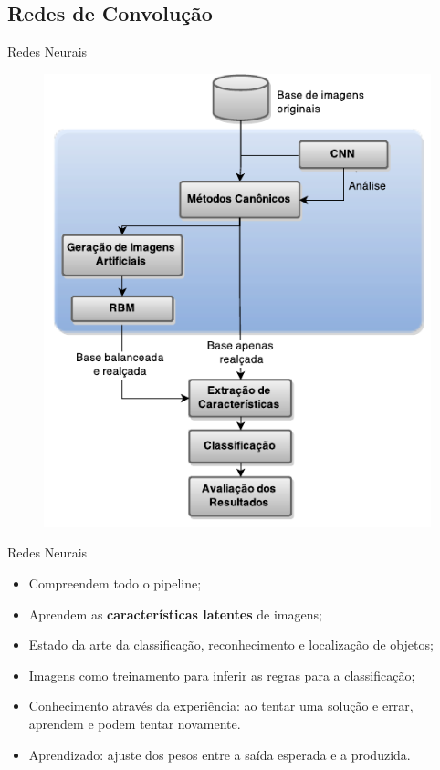 \documentclass{beamer}
\begin{document}
\subsection{Redes de Convolução}
\begin{frame}{Redes Neurais}
\begin{figure}
    \includegraphics[height=0.75\textheight]{figuras/geral.pdf}
\end{figure}
\end{frame}
\begin{frame}{Redes Neurais}
\setlength\leftmargini{0em}
\justifying
  \begin{itemize}
  \item Compreendem todo o pipeline;
  \item Aprendem as \textbf{características latentes} de imagens;
  \item Estado da arte da classificação, reconhecimento e localização de objetos;
  \item Imagens como treinamento para inferir as regras para a classificação;
  \item Conhecimento através da experiência: ao tentar uma solução e errar, aprendem e podem tentar novamente. 
  \item Aprendizado: ajuste dos pesos entre a saída esperada e a produzida. %
  \end{itemize}
\end{frame}
\end{document}

